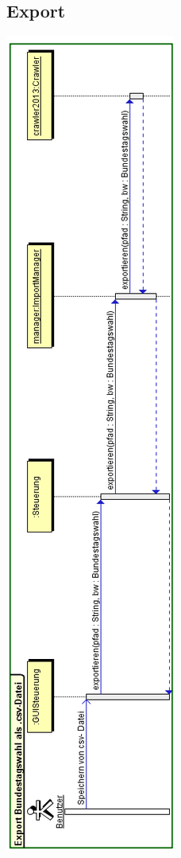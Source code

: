 \documentclass[10pt,a4paper]{article}
\begin{document}
\subsection{Export}
\includegraphics[scale=0.75]{Export-Sequenzdiagramm.png} 
\end{document}
